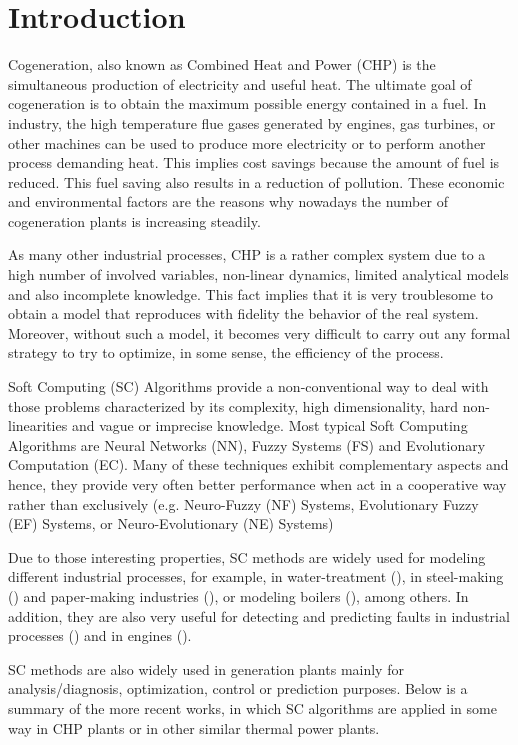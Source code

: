 \section{Introduction}
\label{intro}

Cogeneration, also known as Combined Heat and Power (CHP) is the simultaneous production of electricity and useful heat. The ultimate goal of cogeneration is to obtain the maximum possible energy contained in a fuel. In industry, the high temperature flue gases generated by engines, gas turbines, or other machines can be used to produce more electricity or to perform another process demanding heat. This implies cost savings because the amount of fuel is reduced. This fuel saving also results in a reduction of pollution. These economic and environmental factors are the reasons why nowadays the number of cogeneration plants is increasing steadily. 
\par
 As many other industrial processes, CHP is a rather complex system due to a high number of involved variables, non-linear dynamics, limited analytical models and also incomplete knowledge. This fact implies that it is very troublesome to obtain a model that reproduces with fidelity the behavior of the real system. Moreover, without such a model, it becomes very difficult to carry out any formal strategy to try to optimize, in some sense, the efficiency of the process.
\par
Soft Computing (SC) Algorithms provide a non-conventional way to deal with those problems characterized by its complexity, high dimensionality, hard non-linearities and vague or imprecise knowledge. Most typical Soft Computing Algorithms are Neural Networks (NN), Fuzzy Systems (FS) and Evolutionary Computation (EC). Many of these techniques exhibit complementary  aspects and hence, they provide very often better performance when act in a cooperative way rather than exclusively (e.g. Neuro-Fuzzy (NF) Systems, Evolutionary Fuzzy (EF) Systems, or Neuro-Evolutionary (NE) Systems)
\par
Due to those interesting properties, SC methods are widely used for modeling different industrial processes, for example, in water-treatment (\cite{Noshadi-2013}), in steel-making (\cite{Isazadeh-2012}) and paper-making industries (\cite{Zhang-2012}), or modeling boilers (\cite{Budnik-2012,Huang-2009}), among others. In addition, they are also very useful for detecting and predicting faults in industrial processes (\cite{Rakhshani-2009,Lemma-2013}) and in engines (\cite{Shatnawi-2014,Ghate-2011,Refaat-2013}). 
\par
SC methods are also widely used in generation plants mainly for analysis/diagnosis, optimization, control or prediction purposes. Below is a summary of the more recent works, in which SC algorithms are applied in some way in CHP plants or in other similar thermal power plants.

